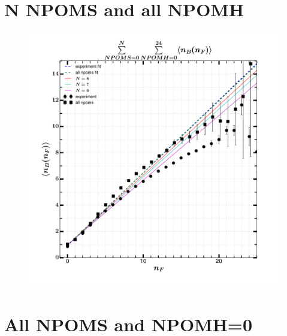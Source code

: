 \documentclass[]{article}
\begin{document}
\section*{\centering N NPOMS and all NPOMH}
\begin{figure}[h!]
\centering
\includegraphics[scale=0.5]{../analyzed/nbnf_Nnpoms_allnpomh.pdf}
\caption{}
\end{figure}

\begin{center}
\end{center}

\newpage
\section*{\centering All NPOMS and NPOMH=0}
\end{document}
